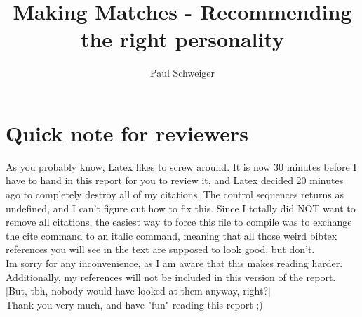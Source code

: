 \documentclass[nochapterpage,bigchapter,linedtoc,longdoc,colorback,accentcolor=tud3b,oneside]{tudreport}
\title{Making Matches - Recommending the right personality}
\subtitle{Paul Schweiger}
\begin{document}
\maketitle


\chapter{Quick note for reviewers}
As you probably know, Latex likes to screw around. It is now 30 minutes before I have to hand in this report for you to review it, and Latex decided 20 minutes ago to completely destroy all of my citations. The control sequences returns as undefined, and I can't figure out how to fix this. Since I totally did NOT want to remove all citations, the easiest way to force this file to compile was to exchange the cite command to an italic command, meaning that all those weird bibtex references you will see in the text are supposed to look good, but don't.\\
Im sorry for any inconvenience, as I am aware that this makes reading harder. Additionally, my references will not be included in this version of the report. [But, tbh, nobody would have looked at them anyway, right?]\\
Thank you very much, and have "fun" reading this report ;)
\end{document}
